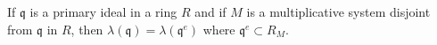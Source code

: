 If $\mathfrak{q}$ is a primary ideal in a ring $R$ and if $M$ is a multiplicative system disjoint from $\mathfrak{q}$ in $R$, then $\lambda(\mathfrak{q}) = \lambda(\mathfrak{q}^e)$ where $\mathfrak{q}^e \subset R_M$.

